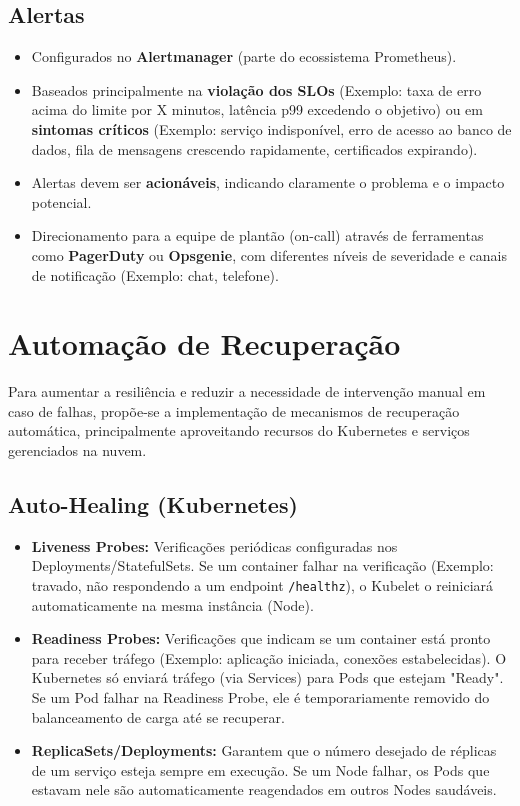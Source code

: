 \subsection{Alertas}
\label{subsec:alertas}
\begin{itemize}
    \item Configurados no \textbf{Alertmanager} (parte do ecossistema Prometheus).
    \item Baseados principalmente na \textbf{violação dos SLOs} (Exemplo: taxa de erro acima do limite por X minutos, latência p99 excedendo o objetivo) ou em \textbf{sintomas críticos} (Exemplo: serviço indisponível, erro de acesso ao banco de dados, fila de mensagens crescendo rapidamente, certificados expirando).
    \item Alertas devem ser \textbf{acionáveis}, indicando claramente o problema e o impacto potencial.
    \item Direcionamento para a equipe de plantão (on-call) através de ferramentas como \textbf{PagerDuty} ou \textbf{Opsgenie}, com diferentes níveis de severidade e canais de notificação (Exemplo: chat, telefone).
\end{itemize}

\section{Automação de Recuperação}
\label{sec:automacao-recuperacao}

Para aumentar a resiliência e reduzir a necessidade de intervenção manual em caso de falhas, propõe-se a implementação de mecanismos de recuperação automática, principalmente aproveitando recursos do Kubernetes e serviços gerenciados na nuvem.

\subsection{Auto-Healing (Kubernetes)}
\label{subsec:auto-healing}
\begin{itemize}
    \item \textbf{Liveness Probes:} Verificações periódicas configuradas nos Deployments/StatefulSets. Se um container falhar na verificação (Exemplo: travado, não respondendo a um endpoint \texttt{/healthz}), o Kubelet o reiniciará automaticamente na mesma instância (Node).
    \item \textbf{Readiness Probes:} Verificações que indicam se um container está pronto para receber tráfego (Exemplo: aplicação iniciada, conexões estabelecidas). O Kubernetes só enviará tráfego (via Services) para Pods que estejam "Ready". Se um Pod falhar na Readiness Probe, ele é temporariamente removido do balanceamento de carga até se recuperar.
    \item \textbf{ReplicaSets/Deployments:} Garantem que o número desejado de réplicas de um serviço esteja sempre em execução. Se um Node falhar, os Pods que estavam nele são automaticamente reagendados em outros Nodes saudáveis.
\end{itemize}

